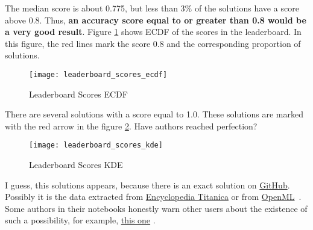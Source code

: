 The median score is about 0.775, but less than 3\% of the solutions have 
a score above 0.8. Thus, \textbf{an accuracy score equal to or greater 
than 0.8 would be a very good result}. Figure \ref{pic:leaderboard_scores_ecdf}
shows ECDF of the scores in the leaderboard. In this figure, the red 
lines mark the score 0.8 and the corresponding proportion of solutions.

\begin{figure}[!ht]
	\centering
	\texttt{[image: leaderboard\_scores\_ecdf]}
	\caption{Leaderboard Scores ECDF}
	\label{pic:leaderboard_scores_ecdf}
\end{figure}

There are several solutions with a score equal to 1.0. These solutions 
are marked with the red arrow in the figure \ref{pic:leaderboard_scores_kde}. 
Have authors reached perfection?

\begin{figure}[!ht]
	\centering
	\texttt{[image: leaderboard\_scores\_kde]}
	\caption{Leaderboard Scores KDE}
	\label{pic:leaderboard_scores_kde}
\end{figure}

I guess, this solutions appears, because there is an exact solution on
\href{https://github.com/thisisjasonjafari/my-datascientise-handcode/raw/master/005-datavisualization/titanic.csv}
{GitHub}. Possibly it is the data extracted from 
\href{https://www.encyclopedia-titanica.org/titanic-survivors/}
{Encyclopedia Titanica}\cite{encyclopedia_titanica} or from
\href{https://www.openml.org/search?type=data&sort=runs&id=40945&status=active}
{OpenML}~\cite{openml_titanic}. Some authors in their notebooks honestly warn 
other users about the existence of such a possibility, for example, 
\href{https://www.kaggle.com/code/suzukifelipe/how-to-be-a-top-lb-explained-for-beginners/notebook?scriptVersionId=99817039}{this one}
\cite{perfection_explanation}.


